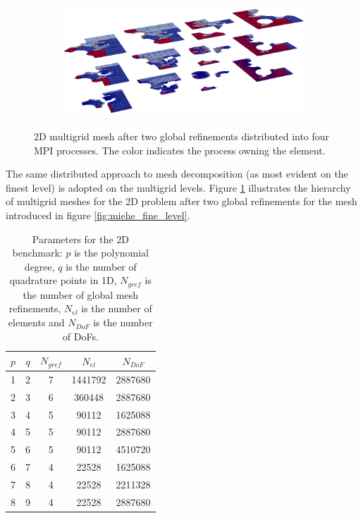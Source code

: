 \documentclass[times,doublespace]{nmeauth}
\newcommand{\changeJP}[1]{#1}
\begin{document}
%
\begin{figure}[!ht]
  \centering
  \begin{subfigure}[b]{0.8\textwidth}
    \centering
    \includegraphics[width=\textwidth]{gmg_2d_4procs.png}
  \end{subfigure}
  \caption{2D multigrid mesh after two global refinements distributed into four MPI processes. The color indicates the process owning the element.}%
  \label{fig:miehe_gmg}
\end{figure}
%
%
\changeJP{The same distributed approach to mesh decomposition (as most evident on the finest level) is adopted on the multigrid levels.}
Figure \ref{fig:miehe_gmg} illustrates the hierarchy of multigrid meshes for the 2D problem after two global refinements \changeJP{for the mesh introduced in figure \ref{fig:miehe_fine_level}}.
%
\begin{table}
  \centering
  \begin{tabular}{ccccc}
  \hline
    $p$ & $q$ & $N_{gref}$ & $N_{el}$ & $N_{DoF}$ \\
  \hline
    1 & 2 & 7 & 1441792 & 2887680 \\
    2 & 3 & 6 & 360448 & 2887680 \\
    3 & 4 & 5 & 90112 & 1625088 \\
    4 & 5 & 5 & 90112 & 2887680 \\
    5 & 6 & 5 & 90112 & 4510720 \\
    6 & 7 & 4 & 22528 & 1625088 \\
    7 & 8 & 4 & 22528 & 2211328 \\
    8 & 9 & 4 & 22528 & 2887680 \\
  \hline
  \end{tabular}
  \caption{Parameters for the 2D benchmark: $p$ is the polynomial degree,
  $q$ is the number of quadrature points in 1D, $N_{gref}$ is the number of global mesh refinements, $N_{el}$ is the number of elements and $N_{DoF}$ is the number of DoFs.
  }
  \label{tab:input_parameters_2d}
\end{table}
\end{document}
